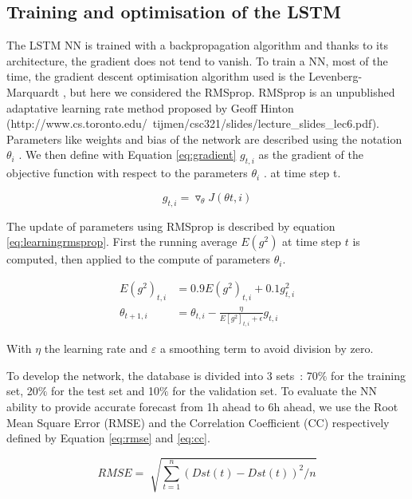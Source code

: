 \subsection{Training and optimisation of the LSTM}


The LSTM NN is trained with a backpropagation algorithm and thanks to its architecture, 
the gradient does not tend to vanish. To train a NN, most of the time, the gradient descent 
optimisation algorithm used is the Levenberg-Marquardt \cite{marquardt1963algorithm}, but here we 
considered the RMSprop. RMSprop is an unpublished adaptative learning rate method proposed by 
Geoff Hinton (http://www.cs.toronto.edu/~tijmen/csc321/slides/lecture\_slides\_lec6.pdf). 
Parameters like weights and bias of the network are described using the notation  \(  \theta _{i} \) . 
We then define with Equation \ref{eq:gradient}  \( g_{t,i} \)  as the gradient of the 
objective function with respect to the parameters \(   \theta _{i} \) . at time step t. 


\begin{equation}\label{eq:gradient}
 g_{t,i} = \triangledown_{ \theta } J \left(  \theta t,i \right)
\end{equation}

The update of parameters using RMSprop is described by equation \ref{eq:learningrmsprop}. First the running average  
\( E \left( g^{2} \right)  \)  at time step  \( t \)  is computed, then applied to the compute 
of parameters  \(  \theta _{i} \).


\begin{align}\label{eq:learningrmsprop}
 E \left( g^{2} \right)_{t,i} &= 0.9E \left( g^{2} \right)_{t,i} + 0.1 g_{t,i}^{2}  \\ 
 \theta _{t+1,i} &= \theta _{t,i} - \frac{ \eta }{E \left[ g^{2} \right]_{t,i}+ \epsilon } g_{t,i}
\end{align}

With  \(  \eta   \) the learning rate and  \(  \varepsilon  \)  a smoothing term to avoid division by zero.

To develop the network, the database is divided into 3 sets : 70$\%$  for the training set, 20$\%$  
for the test set and 10$\%$  for the validation set. To evaluate the NN ability to provide accurate 
forecast from 1h ahead to 6h ahead, we use the Root Mean Square Error (RMSE) and the Correlation Coefficient (CC) 
respectively defined by Equation \ref{eq:rmse} and \ref{eq:cc}. 


\begin{equation}\label{eq:rmse}
 RMSE= \sqrt[]{ \sum _{t=1}^{n} \left( Dst \left( t \right) -Dst \left( t \right)  \right) ^{2}/n}
\end{equation}

